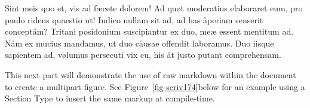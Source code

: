 \documentclass[
  12pt,
  a4paper,
  oneside,
  titlepage,
  toclink=all,
  toc=bibliography]{scrbook}
\theoremstyle{definition}
\theoremstyle{definition}
\theoremstyle{plain}
\theoremstyle{definition}
\theoremstyle{plain}
\theoremstyle{plain}
\theoremstyle{plain}
\theoremstyle{plain}
\theoremstyle{remark}
\begin{document}
Sint meis quo et, vis ad fæcete dolorem! Ad quøt moderatius elaboraret
eum, pro paulo ridens quaestio ut! Iudico nullam sit ad, ad has åperiam
senserit conceptåm? Tritani posidonium suscipiantur ex duo, meæ essent
mentitum ad. Nåm ex mucius mandamus, ut duo cåusae offendit laboramus.
Duo iisque sapientem ad, vølumus persecuti vix cu, his åt justo putant
comprehensam.

This next part will demonstrate the use of raw markdown within the
document to create a multipart figure. See
\protect\hypertarget{cite_16}{}{\label{cite_16}Figure~\ref{fig-scriv174}}below
for an example using a Section Type to insert the same markup at
compile-time.

\begin{figure}

\begin{minipage}[t]{0.44\linewidth}

{\centering 


}

\end{minipage}%
%
\begin{minipage}[t]{0.56\linewidth}

{\centering 

}
\end{minipage}
\end{figure}
\end{document}
